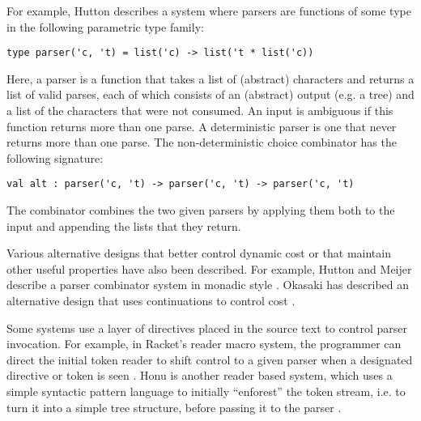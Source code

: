 For example, Hutton describes a system where parsers are functions of some type in the following parametric type family:%
\begin{lstlisting}[numbers=none]
type parser('c, 't) = list('c) -> list('t * list('c))
\end{lstlisting}
Here, a parser is a function that takes a list of (abstract) characters and returns a list of valid parses, each of which consists of an (abstract) output (e.g. a tree) and a list of the characters that were not consumed. An input is ambiguous if this function returns more than one parse. A deterministic parser is one that never returns more than one parse. The  non-deterministic choice combinator  has the following signature: 
\begin{lstlisting}[numbers=none]
val alt : parser('c, 't) -> parser('c, 't) -> parser('c, 't)
\end{lstlisting}
The  combinator combines the two given parsers by applying them both to the input and appending the lists that they return.

Various alternative designs that better control dynamic cost or that maintain other useful properties have also been described. For example, Hutton and Meijer describe a parser combinator system in monadic style \cite{hutton1998monadic}. Okasaki has described an alternative design that uses continuations to control cost \cite{Okasaki98b}.


Some systems use a layer of directives placed in the source text to control parser invocation. For example, in Racket's reader macro system, the programmer can direct the initial token reader to shift control to a given parser when a designated directive or token is seen \cite{Flatt:2012:CLR:2063176.2063195,DBLP:journals/jfp/FlattCDF12}. Honu is another reader based system, which uses a simple syntactic pattern language to initially ``enforest'' the token stream, i.e. to turn it into a simple tree structure, before passing it to the parser \cite{DBLP:conf/gpce/RafkindF12}. %



